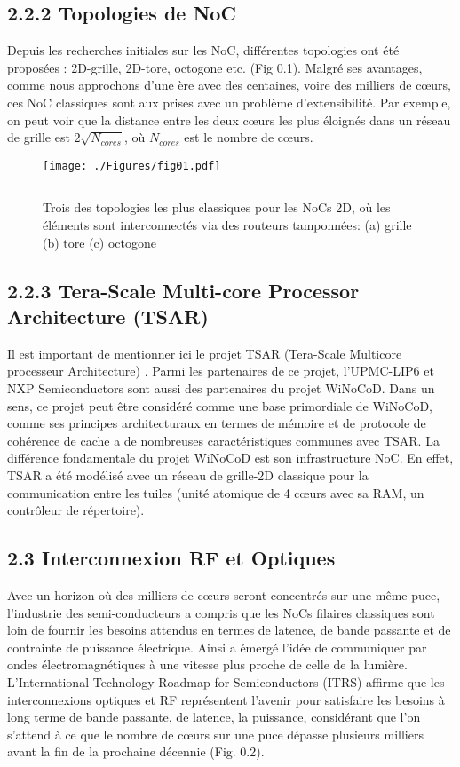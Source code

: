 \subsection*{2.2.2 Topologies de NoC}

Depuis les recherches initiales sur les NoC, différentes topologies ont été proposées  : 2D-grille, 2D-tore, octogone etc. (Fig 0.1). Malgré ses avantages, comme nous approchons d'une ère avec des centaines, voire des milliers de cœurs, ces NoC classiques sont aux prises avec un problème d'extensibilité. Par exemple, on peut voir que la distance entre les deux cœurs les plus éloignés dans un réseau de grille est $2\sqrt{N_{cores}}$, où $N_{cores}$ est le nombre de cœurs.

\begin{figure}[htbp]
  \centering
    \texttt{[image: ./Figures/fig01.pdf]}
    \rule{35em}{0.5pt}
  \caption[Topologies NoC]{Trois des topologies les plus classiques pour les NoCs 2D, où les éléments sont interconnectés via des routeurs tamponnées: (a) grille (b) tore (c) octogone}
  \label{fig:Electron}
\end{figure}

\subsection*{2.2.3 Tera-Scale Multi-core Processor Architecture (TSAR)}
Il est important de mentionner ici le projet TSAR (Tera-Scale Multicore processeur Architecture) \cite{greiner2009tsar}. Parmi les partenaires de ce projet, l'UPMC-LIP6 et NXP Semiconductors sont aussi des partenaires du projet WiNoCoD. Dans un sens, ce projet peut être considéré comme une base primordiale de WiNoCoD, comme ses principes architecturaux en termes de mémoire et de protocole de cohérence de cache a de nombreuses caractéristiques communes avec TSAR. La différence fondamentale du projet WiNoCoD est son infrastructure NoC. En effet, TSAR a été modélisé avec un réseau de grille-2D classique pour la communication entre les tuiles (unité atomique de 4 cœurs avec sa RAM, un contrôleur de répertoire).


\subsection*{2.3 Interconnexion RF et Optiques}

Avec un horizon où des milliers de cœurs seront concentrés sur une même puce, l'industrie des semi-conducteurs a compris que les NoCs filaires classiques sont loin de fournir les besoins attendus en termes de latence, de bande passante et de contrainte de puissance électrique. Ainsi a émergé l'idée de communiquer par ondes électromagnétiques à une vitesse plus proche de celle de la lumière. L’International Technology Roadmap for Semiconductors (ITRS) affirme que les interconnexions optiques et RF représentent l’avenir pour satisfaire les besoins à long terme de bande passante, de latence, la puissance, considérant que l’on s’attend à ce que le nombre de cœurs sur une puce dépasse plusieurs milliers avant la fin de la prochaine décennie (Fig. 0.2).

